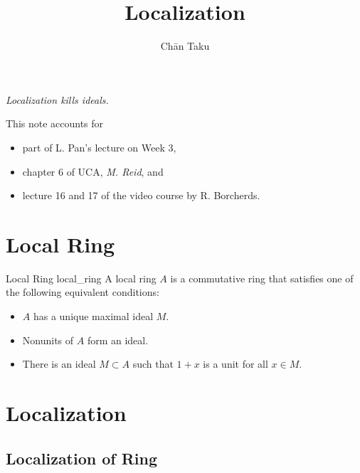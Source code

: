 \documentclass{article}
\title{Localization}
\author{Ch\=an Taku}
\begin{document}
\maketitle

\begin{flushright}
    \textit{Localization kills ideals.}
\end{flushright}

This note accounts for
\begin{itemize}
    \item part of L. Pan's lecture on Week 3,
    \item chapter 6 of UCA, \textit{M. Reid}, and
    \item lecture 16 and 17 of the video course by R. Borcherds.
\end{itemize}

\section{Local Ring}

\begin{definition}{Local Ring }{local_ring}
    A local ring $A$ is a commutative ring that satisfies one of the following equivalent conditions:
    \begin{itemize}
        \item $A$ has a unique maximal ideal $M$.
        \item Nonunits of $A$ form an ideal.
        \item There is an ideal $M\subset A$ such that $1+x$ is a unit for all $x\in M$.
    \end{itemize}
\end{definition}

\section{Localization}

\subsection{Localization of Ring}
\end{document}
